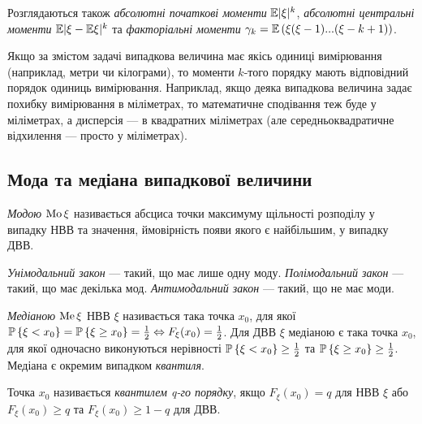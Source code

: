 Розглядаються також \emph{абсолютні початкові моменти} $\E\vert \xi \vert ^k$, \emph{абсолютні центральні моменти} $\E\vert \xi - \E\xi \vert ^k$
та \emph{факторіальні моменти} $\gamma_k = \E\left( \xi (\xi - 1) ... (\xi - k + 1)\right)$.
\begin{remark}
    Якщо за змістом задачі випадкова величина має якісь одиниці вимірювання (наприклад, метри чи кілограми),
    то моменти $k$-того порядку мають відповідний порядок одиниць вимірювання.
    Наприклад, якщо деяка випадкова величина задає похибку вимірювання в міліметрах,
    то математичне сподівання теж буде у міліметрах, а дисперсія --- в квадратних міліметрах
    (але середньоквадратичне відхилення --- просто у міліметрах).
\end{remark}


\subsection{Мода та медіана випадкової величини}
\begin{definition}
    \emph{Модою} $\Mo\xi$ називається абсциса точки максимуму щільності 
    розподілу у випадку НВВ та значення, ймовірність 
    появи якого є найбільшим, у випадку ДВВ.

    \emph{Унімодальний закон} --- такий, що має лише одну моду. 
    \emph{Полімодальний закон} --- такий, що має декілька мод.
    \emph{Антимодальний закон} --- такий, що не має моди.
\end{definition}
\begin{definition}
    \emph{Медіаною} $\Me\xi$ НВВ $\xi$ називається така точка $x_0$, для якої 
    $\P\left\{\xi < x_0\right\} = \P\left\{\xi \geq x_0\right\} 
    = \frac{1}{2} \Leftrightarrow F_\xi(x_0) = \frac{1}{2}$.
    Для ДВВ $\xi$ медіаною є така точка $x_0$, для якої одночасно
    виконуються нерівності $\P\left\{\xi < x_0\right\} \geq \frac{1}{2}$ та
    $\P\left\{\xi \geq x_0\right\} \geq \frac{1}{2}$.
    Медіана є окремим випадком \emph{квантиля}.
\end{definition}
\begin{definition}
    Точка $x_0$ називається \emph{квантилем q-го порядку}, якщо $F_\xi(x_0) = q$ 
    для НВВ $\xi$ або $F_\xi(x_0) \geq q$ та $F_\xi(x_0) \geq 1-q$ для ДВВ.
\end{definition}
